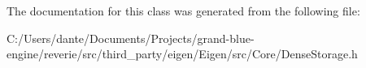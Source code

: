 The documentation for this class was generated from the following file\+:\begin{DoxyCompactItemize}
\item 
C\+:/\+Users/dante/\+Documents/\+Projects/grand-\/blue-\/engine/reverie/src/third\+\_\+party/eigen/\+Eigen/src/\+Core/Dense\+Storage.\+h\end{DoxyCompactItemize}
